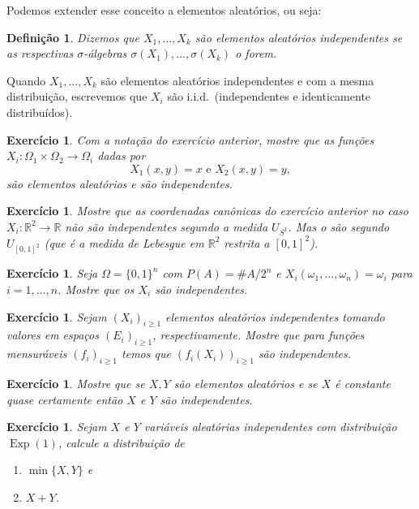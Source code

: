 \documentclass[reqno, final]{book}
\newcommand*\1{\mathds{1}}
\newtheorem{definition}[theorem]{Definição}
\newtheorem{exercise}[example]{Exercício}
\DeclareMathOperator{\Exp}{Exp}
\def \iid{i.i.d.~}
\begin{document}
Podemos extender esse conceito a elementos aleatórios, ou seja:
\begin{definition}
  Dizemos que $X_1, \dots, X_k$ são elementos aleatórios independentes  se as respectivas $\sigma$-álgebras $\sigma(X_1), \dots, \sigma(X_k)$ o forem.
\end{definition}

Quando $X_1, \dots, X_k$ são elementos aleatórios independentes e com a mesma distribuição, escrevemos que $X_i$ são \iid (independentes e identicamente distribuídos).

\begin{exercise}
  Com a notação do exercício anterior, mostre que as funções $X_i:\Omega_1 \times \Omega_2 \to \Omega_i$ dadas por
  \begin{equation}
    X_1(x,y) = x \text{ e } X_2 (x,y) = y,
  \end{equation}
  são elementos aleatórios e são independentes.
\end{exercise}

\begin{exercise}
  Mostre que as coordenadas canônicas do exercício anterior no caso $X_i: \mathbb{R}^2 \to \mathbb{R}$ não são independentes segundo a medida $U_{S^1}$.
  Mas o são segundo $U_{[0,1]^2}$ (que é a medida de Lebesgue em $\mathbb{R}^2$ restrita a $[0,1]^2$).
\end{exercise}

\begin{exercise}
  Seja $\Omega = \{0,1\}^n$ com $P(A) = \#A/2^n$ e $X_i(\omega_1, \dots, \omega_n) = \omega_i$ para $i = 1, \dots, n$.
  Mostre que os $X_i$ são independentes.
\end{exercise}

\begin{exercise}
  Sejam $(X_i)_{i \geq 1}$ elementos aleatórios independentes tomando valores em espaços $(E_i)_{i \geq 1}$, respectivamente.
  Mostre que para funções mensuráveis $(f_i)_{i \geq 1}$ temos que $(f_i(X_i))_{i \geq 1}$ são independentes.
\end{exercise}

\begin{exercise}
  Mostre que se $X, Y$ são elementos aleatórios e se $X$ é constante quase certamente então $X$ e $Y$ são independentes.
\end{exercise}

\begin{exercise}
  Sejam $X$ e $Y$ variáveis aleatórias independentes com distribuição $\Exp(1)$, calcule a distribuição de
  \begin{enumerate}[\quad a)]
  \item $\min\{X,Y\}$ e
  \item $X + Y$.
  \end{enumerate}
\end{exercise}
\end{document}
